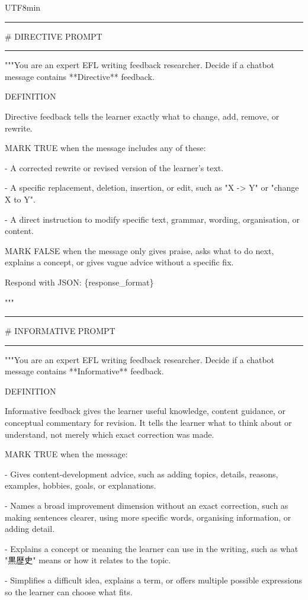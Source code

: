 \begin{CJK}{UTF8}{min}
\medskip\hrule\medskip

\# DIRECTIVE PROMPT

\medskip\hrule\medskip

"""You are an expert EFL writing feedback researcher. Decide if a chatbot message contains **Directive** feedback.

DEFINITION

Directive feedback tells the learner exactly what to change, add, remove, or rewrite.

MARK TRUE when the message includes any of these:

- A corrected rewrite or revised version of the learner's text.

- A specific replacement, deletion, insertion, or edit, such as "X -\textgreater{} Y" or "change X to Y".

- A direct instruction to modify specific text, grammar, wording, organisation, or content.

MARK FALSE when the message only gives praise, asks what to do next, explains a concept, or gives vague advice without a specific fix.

Respond with JSON: \{response\_format\}

"""

\medskip\hrule\medskip

\# INFORMATIVE PROMPT

\medskip\hrule\medskip

"""You are an expert EFL writing feedback researcher. Decide if a chatbot message contains **Informative** feedback.

DEFINITION

Informative feedback gives the learner useful knowledge, content guidance, or conceptual commentary for revision. It tells the learner what to think about or understand, not merely which exact correction was made.

MARK TRUE when the message:

- Gives content-development advice, such as adding topics, details, reasons, examples, hobbies, goals, or explanations.

- Names a broad improvement dimension without an exact correction, such as making sentences clearer, using more specific words, organising information, or adding detail.

- Explains a concept or meaning the learner can use in the writing, such as what "黒歴史" means or how it relates to the topic.

- Simplifies a difficult idea, explains a term, or offers multiple possible expressions so the learner can choose what fits.


\end{CJK}
